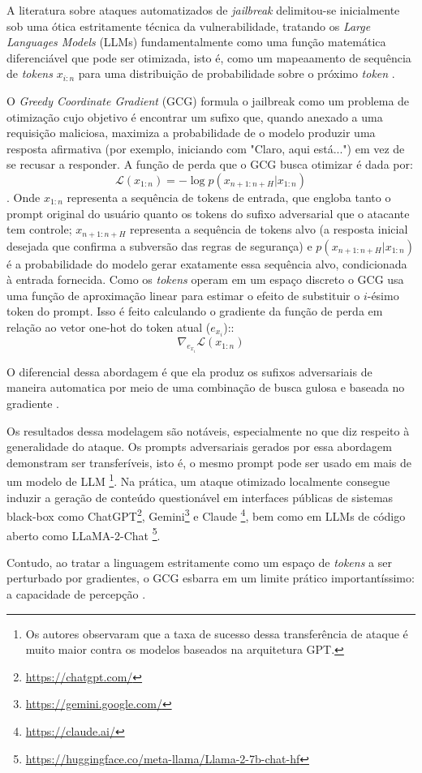 A literatura sobre ataques automatizados de \textit{jailbreak} delimitou-se inicialmente sob uma ótica estritamente técnica da vulnerabilidade, tratando os \textit{Large Languages Models} (LLMs) fundamentalmente como uma função matemática diferenciável que pode ser otimizada, isto é, como um mapeaamento de sequência de \textit{tokens} $x_{i:n}$ para uma distribuição de probabilidade sobre o próximo \textit{token} \cite{zou2023universaltransferableadversarialattacks}.

O \textit{Greedy Coordinate Gradient } (GCG) formula o jailbreak como um problema de otimização cujo objetivo é encontrar um sufixo que, quando anexado a uma requisição maliciosa, maximiza a probabilidade de o modelo produzir uma resposta afirmativa (por exemplo, iniciando com "Claro, aqui está...") em vez de se recusar a responder. A função de perda que o GCG busca otimizar é dada por: $$\mathcal{L}(x_{1:n}) = -\log p(x_{n+1:n+H} \vert{} x_{1:n})$$. Onde $x_{1:n}$ representa a sequência de tokens de entrada, que engloba tanto o prompt original do usuário quanto os tokens do sufixo adversarial que o atacante tem controle; $x_{n+1:n+H}$ representa a sequência de tokens alvo (a resposta inicial desejada que confirma a subversão das regras de segurança) e $p(x_{n+1:n+H} \vert{} x_{1:n})$ é a probabilidade do modelo gerar exatamente essa sequência alvo, condicionada à entrada fornecida. Como os \textit{tokens} operam em um espaço discreto o GCG usa uma função de aproximação linear para estimar o efeito de substituir o $i$-ésimo token do prompt. Isso é feito calculando o gradiente da função de perda em relação ao vetor one-hot do token atual ($e_{x_i}$):: $$\nabla_{e_{x_i}}\mathcal{L}(x_{1:n})$$

O diferencial dessa abordagem é que ela produz os sufixos adversariais de maneira automatica por meio de uma combinação de busca gulosa e baseada no gradiente \cite{zou2023universaltransferableadversarialattacks}.

Os resultados dessa modelagem são notáveis, especialmente no que diz respeito à generalidade do ataque. Os prompts adversariais gerados por essa abordagem demonstram ser transferíveis, isto é, o mesmo prompt pode ser usado em mais de um modelo de LLM \footnote{Os autores observaram que a taxa de sucesso dessa transferência de ataque é muito maior contra os modelos baseados na arquitetura GPT.}. Na prática, um ataque otimizado localmente consegue induzir a geração de conteúdo questionável em interfaces públicas de sistemas black-box como ChatGPT\footnote{\url{https://chatgpt.com/}}, Gemini\footnote{\url{https://gemini.google.com/}} e Claude \footnote{\url{https://claude.ai/}}, bem como em LLMs de código aberto como LLaMA-2-Chat \footnote{\url{https://huggingface.co/meta-llama/Llama-2-7b-chat-hf}}.

Contudo, ao tratar a linguagem estritamente como um espaço de \textit{tokens} a ser perturbado por gradientes, o GCG esbarra em um limite prático importantíssimo: a capacidade de percepção \cite{zou2023universaltransferableadversarialattacks}.